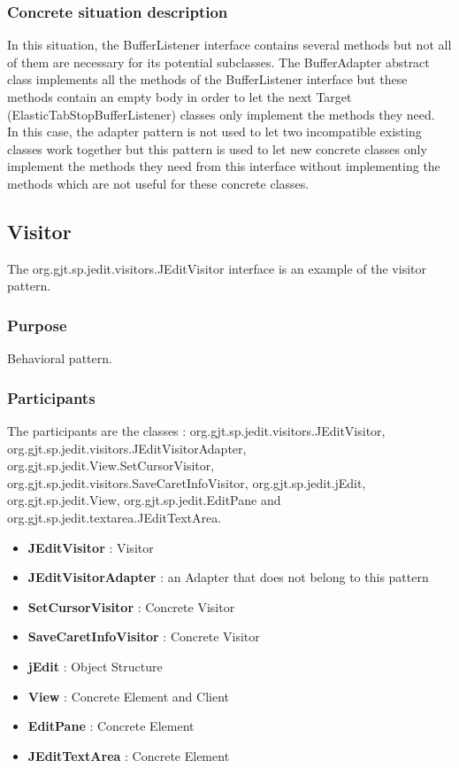 \documentclass[a4paper,10pt]{article}
\begin{document}
\subsubsection{Concrete situation description}
In this situation, the BufferListener interface contains several methods but not all of them are necessary for its potential subclasses. The BufferAdapter abstract class implements all the methods of the BufferListener interface but these methods contain an empty body in order to let the next Target (ElasticTabStopBufferListener) classes only implement the methods they need.\\
In this case, the adapter pattern is not used to let two incompatible existing classes work together but this pattern is used to let new concrete classes only implement the methods they need from this interface without implementing the methods which are not useful for these concrete classes.

\subsection{Visitor}
The org.gjt.sp.jedit.visitors.JEditVisitor interface is an example of the visitor pattern.
\subsubsection{Purpose}
Behavioral pattern.
\subsubsection[Participants]{Participants\footnotemark[1]}
The participants are the classes : org.gjt.sp.jedit.visitors.JEditVisitor, org.gjt.sp.jedit.visitors.JEditVisitorAdapter, org.gjt.sp.jedit.View.SetCursorVisitor, org.gjt.sp.jedit.visitors.SaveCaretInfoVisitor, org.gjt.sp.jedit.jEdit, org.gjt.sp.jedit.View, org.gjt.sp.jedit.EditPane and org.gjt.sp.jedit.textarea.JEditTextArea.
\begin{itemize}
 \item \textbf{JEditVisitor} : Visitor
 \item \textbf{JEditVisitorAdapter} : an Adapter that does not belong to this pattern
 \item \textbf{SetCursorVisitor} : Concrete Visitor
 \item \textbf{SaveCaretInfoVisitor} : Concrete Visitor
 \item \textbf{jEdit} : Object Structure
 \item \textbf{View} : Concrete Element and Client
 \item \textbf{EditPane} : Concrete Element
 \item \textbf{JEditTextArea} : Concrete Element
\end{itemize}
\end{document}

